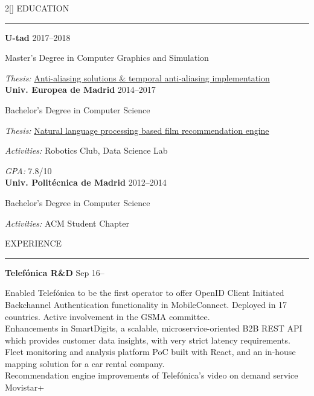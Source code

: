 \documentclass[a4paper, 12pt]{article}
\newenvironment{myparacol}[2][]{%
\begin{paracol}{#2}[#1]\setlength{\parindent}{0pt}}{%
\end{paracol}}
\begin{document}
\setlength{\columnsep}{24pt}
\begin{sloppypar}
\begin{myparacol}{2}
    EDUCATION
    \vspace{1mm}
    \hrule
    \kern9pt
    \textbf{U-tad} \hfill 2017--2018

    Master's Degree in Computer Graphics and Simulation

    \textit{Thesis:} \href{https://github.com/hugo19941994/temporal-aa-doc/raw/master/thesis.pdf}{Anti-aliasing solutions \& temporal anti-aliasing implementation}\\

    \textbf{Univ. Europea de Madrid} \hfill 2014--2017

    Bachelor's Degree in Computer Science

    \textit{Thesis:} \href{https://github.com/hugo19941994/movie-pepper-doc/raw/master/thesis.pdf}{Natural language processing based film recommendation engine}

    \textit{Activities:} Robotics Club, Data Science Lab

    \textit{GPA:} 7.8/10\\

    \textbf{Univ. Politécnica de Madrid} \hfill 2012--2014

    Bachelor's Degree in Computer Science

    \textit{Activities:} ACM Student Chapter
    \\

    \switchcolumn{}

    EXPERIENCE
    \vspace{1mm}
    \hrule
    \kern9pt

    \textbf{Telefónica R\&D} \hfill Sep 16--

    Enabled Telefónica to be the first operator to offer OpenID Client Initiated Backchannel Authentication functionality in MobileConnect. Deployed in 17 countries. Active involvement in the GSMA committee\@.\\

    Enhancements in SmartDigits, a scalable,  microservice-oriented B2B REST API which provides customer data insights, with very strict latency requirements.\\

    Fleet monitoring and analysis platform PoC built with React, and an in-house mapping solution for a car rental company.\\

    Recommendation engine improvements of Telefónica's video on demand service Movistar+\\


\end{myparacol}
\end{sloppypar}
\end{document}
